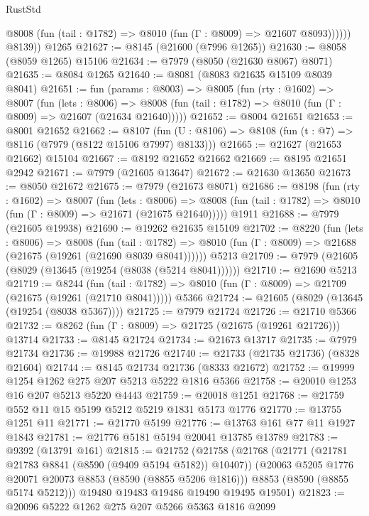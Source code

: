 \begin{lexlean}{RustStd}
\begin{coremodule}
              @8008 (fun (tail : @1782) => @8010 (fun (Γ : @8009) => @21607 @8093))))))
        @8139))
    @1265
@21627 := @8145 (@21600 (@7996 @1265))
@21630 := @8058 (@8059 @1265) @15106
@21634 := @7979 (@8050 (@21630 @8067) @8071)
@21635 := @8084 @1265
@21640 := @8081 (@8083 @21635 @15109 @8039 @8041)
@21651 := fun (params : @8003) =>
  @8005
    (fun (rty : @1602) =>
    @8007
      (fun (lets : @8006) =>
      @8008 (fun (tail : @1782) => @8010 (fun (Γ : @8009) => @21607 (@21634 @21640)))))
@21652 := @8004 @21651
@21653 := @8001 @21652
@21662 := @8107
    (fun (U : @8106) => @8108 (fun (t : @7) => @8116 (@7979 (@8122 @15106 @7997) @8133)))
@21665 := @21627 (@21653 @21662) @15104
@21667 := @8192 @21652 @21662
@21669 := @8195 @21651 @2942
@21671 := @7979 (@21605 @13647)
@21672 := @21630 @13650
@21673 := @8050 @21672
@21675 := @7979 (@21673 @8071)
@21686 := @8198
    (fun (rty : @1602) =>
    @8007
      (fun (lets : @8006) =>
      @8008 (fun (tail : @1782) => @8010 (fun (Γ : @8009) => @21671 (@21675 @21640)))))
    @1911
@21688 := @7979 (@21605 @19938)
@21690 := @19262 @21635 @15109
@21702 := @8220
    (fun (lets : @8006) =>
    @8008
      (fun (tail : @1782) =>
      @8010 (fun (Γ : @8009) => @21688 (@21675 (@19261 (@21690 @8039 @8041))))))
    @5213
@21709 := @7979 (@21605 (@8029 (@13645 (@19254 (@8038 (@5214 @8041))))))
@21710 := @21690 @5213
@21719 := @8244
    (fun (tail : @1782) => @8010 (fun (Γ : @8009) => @21709 (@21675 (@19261 (@21710 @8041)))))
    @5366
@21724 := @21605 (@8029 (@13645 (@19254 (@8038 @5367))))
@21725 := @7979 @21724
@21726 := @21710 @5366
@21732 := @8262 (fun (Γ : @8009) => @21725 (@21675 (@19261 @21726))) @13714
@21733 := @8145 @21724
@21734 := @21673 @13717
@21735 := @7979 @21734
@21736 := @19988 @21726
@21740 := @21733 (@21735 @21736) (@8328 @21604)
@21744 := @8145 @21734 @21736 (@8333 @21672)
@21752 := @19999 @1254 @1262 @275 @207 @5213 @5222 @1816 @5366
@21758 := @20010 @1253 @16 @207 @5213 @5220 @4443
@21759 := @20018 @1251
@21768 := @21759 @552 @11 @15 @5199 @5212 @5219 @1831 @5173 @1776
@21770 := @13755 @1251 @11
@21771 := @21770 @5199
@21776 := @13763 @161 @77 @11 @1927 @1843
@21781 := @21776 @5181 @5194 @20041 @13785 @13789
@21783 := @9392 (@13791 @161)
@21815 := @21752
    (@21758
      (@21768
        (@21771 (@21781 @21783 @8841 (@8590 (@9409 @5194 @5182)) @10407))
        (@20063 @5205 @1776 @20071 @20073 @8853 (@8590 (@8855 @5206 @1816)))
        @8853
        (@8590 (@8855 @5174 @5212)))
      @19480
      @19483
      @19486
      @19490
      @19495
      @19501)
@21823 := @20096 @5222 @1262 @275 @207 @5266 @5363 @1816 @2099

\end{coremodule}
\end{lexlean}
